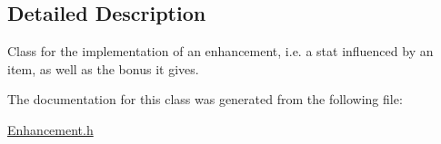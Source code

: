\subsection{Detailed Description}
Class for the implementation of an enhancement, i.\+e. a stat influenced by an item, as well as the bonus it gives. 

The documentation for this class was generated from the following file\+:\begin{DoxyCompactItemize}
\item 
\hyperlink{_enhancement_8h}{Enhancement.\+h}\end{DoxyCompactItemize}
